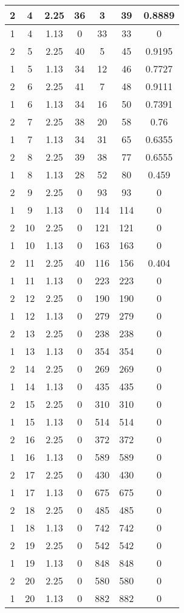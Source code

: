 \documentclass[letterpaper, 12pt]{article}
\begin{document}
\begin{longtable}{|c|c|c|c|c|c|c|}
\hline
2 & 4 & 2.25 & 36 & 3 & 39 & 0.8889 \\
\hline
1 & 4 & 1.13 & 0 & 33 & 33 & 0 \\
\hline
2 & 5 & 2.25 & 40 & 5 & 45 & 0.9195 \\
\hline
1 & 5 & 1.13 & 34 & 12 & 46 & 0.7727 \\
\hline
2 & 6 & 2.25 & 41 & 7 & 48 & 0.9111 \\
\hline
1 & 6 & 1.13 & 34 & 16 & 50 & 0.7391 \\
\hline
2 & 7 & 2.25 & 38 & 20 & 58 & 0.76 \\
\hline
1 & 7 & 1.13 & 34 & 31 & 65 & 0.6355 \\
\hline
2 & 8 & 2.25 & 39 & 38 & 77 & 0.6555 \\
\hline
1 & 8 & 1.13 & 28 & 52 & 80 & 0.459 \\
\hline
2 & 9 & 2.25 & 0 & 93 & 93 & 0 \\
\hline
1 & 9 & 1.13 & 0 & 114 & 114 & 0 \\
\hline
2 & 10 & 2.25 & 0 & 121 & 121 & 0 \\
\hline
1 & 10 & 1.13 & 0 & 163 & 163 & 0 \\
\hline
2 & 11 & 2.25 & 40 & 116 & 156 & 0.404 \\
\hline
1 & 11 & 1.13 & 0 & 223 & 223 & 0 \\
\hline
2 & 12 & 2.25 & 0 & 190 & 190 & 0 \\
\hline
1 & 12 & 1.13 & 0 & 279 & 279 & 0 \\
\hline
2 & 13 & 2.25 & 0 & 238 & 238 & 0 \\
\hline
1 & 13 & 1.13 & 0 & 354 & 354 & 0 \\
\hline
2 & 14 & 2.25 & 0 & 269 & 269 & 0 \\
\hline
1 & 14 & 1.13 & 0 & 435 & 435 & 0 \\
\hline
2 & 15 & 2.25 & 0 & 310 & 310 & 0 \\
\hline
1 & 15 & 1.13 & 0 & 514 & 514 & 0 \\
\hline
2 & 16 & 2.25 & 0 & 372 & 372 & 0 \\
\hline
1 & 16 & 1.13 & 0 & 589 & 589 & 0 \\
\hline
2 & 17 & 2.25 & 0 & 430 & 430 & 0 \\
\hline
1 & 17 & 1.13 & 0 & 675 & 675 & 0 \\
\hline
2 & 18 & 2.25 & 0 & 485 & 485 & 0 \\
\hline
1 & 18 & 1.13 & 0 & 742 & 742 & 0 \\
\hline
2 & 19 & 2.25 & 0 & 542 & 542 & 0 \\
\hline
1 & 19 & 1.13 & 0 & 848 & 848 & 0 \\
\hline
2 & 20 & 2.25 & 0 & 580 & 580 & 0 \\
\hline
1 & 20 & 1.13 & 0 & 882 & 882 & 0 \\
\hline
\end{longtable}
\end{document}
